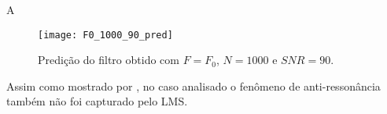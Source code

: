 A 

\begin{figure}[h]
	\centering
	\texttt{[image: F0\_1000\_90\_pred]}
	\caption{Predição do filtro obtido com $ F=F_0 $, $ N=1000 $ e $ SNR=90 $.}
	\label{fig:F0_1000_90_pred}
\end{figure}


Assim como mostrado por \citet{castello2005experimental}, no caso analisado o fenômeno de anti-ressonância também não foi capturado pelo LMS.

